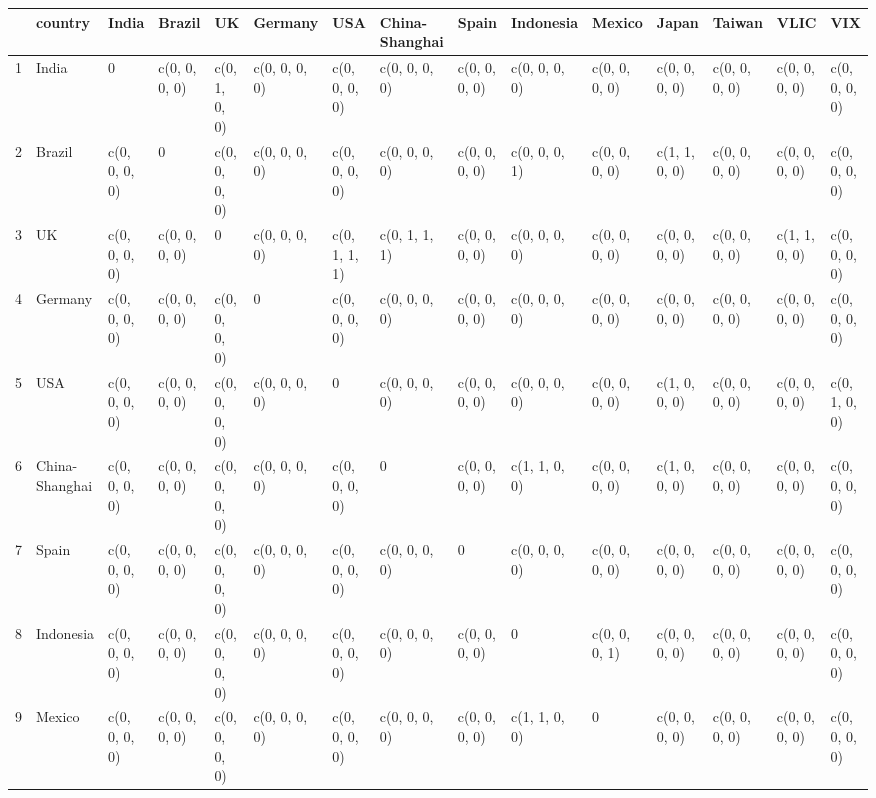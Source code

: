 \begin{table}[ht]
\centering
\begin{tabular}{lllllllllllllll}
  \hline
 & country & India & Brazil & UK & Germany & USA & China-Shanghai & Spain & Indonesia & Mexico & Japan & Taiwan & VLIC & VIX \\ 
  \hline
1 & India &             0 & c(0, 0, 0, 0) & c(0, 1, 0, 0) & c(0, 0, 0, 0) & c(0, 0, 0, 0) & c(0, 0, 0, 0) & c(0, 0, 0, 0) & c(0, 0, 0, 0) & c(0, 0, 0, 0) & c(0, 0, 0, 0) & c(0, 0, 0, 0) & c(0, 0, 0, 0) & c(0, 0, 0, 0) \\ 
  2 & Brazil & c(0, 0, 0, 0) &             0 & c(0, 0, 0, 0) & c(0, 0, 0, 0) & c(0, 0, 0, 0) & c(0, 0, 0, 0) & c(0, 0, 0, 0) & c(0, 0, 0, 1) & c(0, 0, 0, 0) & c(1, 1, 0, 0) & c(0, 0, 0, 0) & c(0, 0, 0, 0) & c(0, 0, 0, 0) \\ 
  3 & UK & c(0, 0, 0, 0) & c(0, 0, 0, 0) &             0 & c(0, 0, 0, 0) & c(0, 1, 1, 1) & c(0, 1, 1, 1) & c(0, 0, 0, 0) & c(0, 0, 0, 0) & c(0, 0, 0, 0) & c(0, 0, 0, 0) & c(0, 0, 0, 0) & c(1, 1, 0, 0) & c(0, 0, 0, 0) \\ 
  4 & Germany & c(0, 0, 0, 0) & c(0, 0, 0, 0) & c(0, 0, 0, 0) &             0 & c(0, 0, 0, 0) & c(0, 0, 0, 0) & c(0, 0, 0, 0) & c(0, 0, 0, 0) & c(0, 0, 0, 0) & c(0, 0, 0, 0) & c(0, 0, 0, 0) & c(0, 0, 0, 0) & c(0, 0, 0, 0) \\ 
  5 & USA & c(0, 0, 0, 0) & c(0, 0, 0, 0) & c(0, 0, 0, 0) & c(0, 0, 0, 0) &             0 & c(0, 0, 0, 0) & c(0, 0, 0, 0) & c(0, 0, 0, 0) & c(0, 0, 0, 0) & c(1, 0, 0, 0) & c(0, 0, 0, 0) & c(0, 0, 0, 0) & c(0, 1, 0, 0) \\ 
  6 & China-Shanghai & c(0, 0, 0, 0) & c(0, 0, 0, 0) & c(0, 0, 0, 0) & c(0, 0, 0, 0) & c(0, 0, 0, 0) &             0 & c(0, 0, 0, 0) & c(1, 1, 0, 0) & c(0, 0, 0, 0) & c(1, 0, 0, 0) & c(0, 0, 0, 0) & c(0, 0, 0, 0) & c(0, 0, 0, 0) \\ 
  7 & Spain & c(0, 0, 0, 0) & c(0, 0, 0, 0) & c(0, 0, 0, 0) & c(0, 0, 0, 0) & c(0, 0, 0, 0) & c(0, 0, 0, 0) &             0 & c(0, 0, 0, 0) & c(0, 0, 0, 0) & c(0, 0, 0, 0) & c(0, 0, 0, 0) & c(0, 0, 0, 0) & c(0, 0, 0, 0) \\ 
  8 & Indonesia & c(0, 0, 0, 0) & c(0, 0, 0, 0) & c(0, 0, 0, 0) & c(0, 0, 0, 0) & c(0, 0, 0, 0) & c(0, 0, 0, 0) & c(0, 0, 0, 0) &             0 & c(0, 0, 0, 1) & c(0, 0, 0, 0) & c(0, 0, 0, 0) & c(0, 0, 0, 0) & c(0, 0, 0, 0) \\ 
  9 & Mexico & c(0, 0, 0, 0) & c(0, 0, 0, 0) & c(0, 0, 0, 0) & c(0, 0, 0, 0) & c(0, 0, 0, 0) & c(0, 0, 0, 0) & c(0, 0, 0, 0) & c(1, 1, 0, 0) &             0 & c(0, 0, 0, 0) & c(0, 0, 0, 0) & c(0, 0, 0, 0) & c(0, 0, 0, 0) \\ 

\end{tabular}
\end{table}
